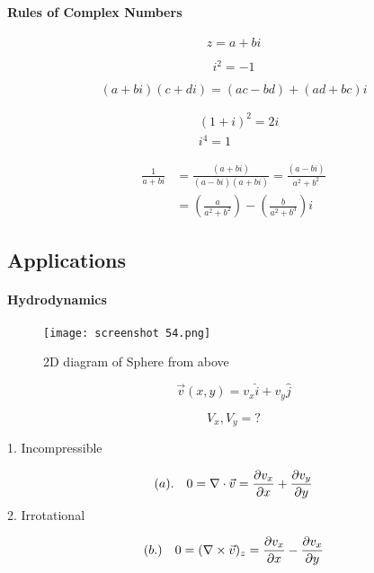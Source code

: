 \documentclass[svgnames]{article}   	%
\begin{document}
\paragraph{Rules of Complex Numbers}

\[
z = a + bi
\]

\[
 i^2 = -1
\]

\[
  (a + bi)(c + di) = (ac - bd) + (ad + bc)i
\]
\vspace{5px}
\begin{tcolorbox}[title = Example]

  \begin{align*}
    &(1+i)^2 = 2i \\
    &i^4 = 1
  \end{align*}

\end{tcolorbox}
\vspace{5px}

\begin{align*}
  \frac{1}{a+bi} &= \frac{(a+bi)}{(a-bi)(a+bi)} = \frac{(a-bi)}{a^2 + b^2} \\
                 &= \left(\frac{a}{a^2+b^2}\right) - \left(\frac{b}{a^2 + b^3}\right)i
\end{align*}

\subsection{Applications}

\paragraph{Hydrodynamics}


\begin{figure}[H]
  \centering
    \texttt{[image: screenshot 54.png]}
    \caption{2D diagram of Sphere from above}
\end{figure}


\[
\vec{v}(x,y) = v_x \hat{i} + v_y \hat{j}
\]

\begin{tcolorbox}[title = Problem]	
  
  \[
  V_x, V_y = ? 
  \]
  
\end{tcolorbox}	

\begin{tcolorbox}[title = Model]

  1. Incompressible
  
   \[
     (a). \hspace{10px} 0 = \nabla \cdot \vec{v} = \frac{\partial v_x}{\partial x} + \frac{\partial
    v_y}{\partial y} 
  \] 
  2. Irrotational

  \[
    (b.) \hspace{10px} 0 = (\nabla \times \vec{v})_z = \frac{\partial v_x}{\partial x}
    - \frac{\partial v_x}{\partial y} 
  \]

\end{tcolorbox}
\end{document}
